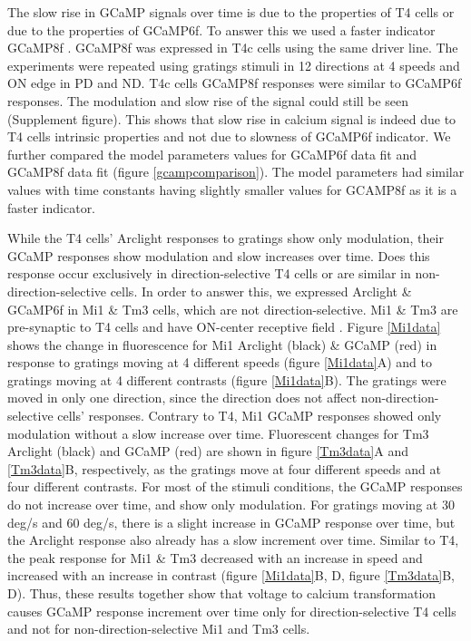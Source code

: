 \documentclass[9pt,lineno]{elife}
\begin{document}
The slow rise in GCaMP signals over time is due to the properties of T4 cells or due to the properties of GCaMP6f. To answer this we used a faster indicator GCaMP8f \parencite{Zhang2020}. GCaMP8f was expressed in T4c cells using the same driver line. The experiments were repeated using gratings stimuli in 12 directions at 4 speeds and ON edge in PD and ND. T4c cells GCaMP8f responses were similar to GCaMP6f responses. The modulation and slow rise of the signal could still be seen (Supplement figure). This shows that slow rise in calcium signal is indeed due to T4 cells intrinsic properties and not due to slowness of GCaMP6f indicator. We further compared the model parameters values for GCaMP6f data fit and GCaMP8f data fit (figure \ref{gcampcomparison}). The model parameters had similar values with time constants having slightly smaller values for GCAMP8f as it is a faster indicator.

While the T4 cells' Arclight responses to gratings show only modulation, their GCaMP responses show modulation and slow increases over time. Does this response occur exclusively in direction-selective T4 cells or are similar in non-direction-selective cells. In order to answer this, we expressed Arclight \& GCaMP6f in Mi1 \& Tm3 cells, which are not direction-selective. Mi1 \& Tm3 are pre-synaptic to T4 cells and have ON-center receptive field \parencite{Takemura2017, Arenz2017}. Figure \ref{Mi1data} shows the change in fluorescence for Mi1 Arclight (black) \& GCaMP (red) in response to gratings moving at 4 different speeds (figure \ref{Mi1data}A) and to gratings moving at 4 different contrasts (figure \ref{Mi1data}B). The gratings were moved in only one direction, since the direction does not affect non-direction-selective cells' responses. Contrary to T4, Mi1 GCaMP responses showed only modulation without a slow increase over time. Fluorescent changes for Tm3 Arclight (black) and GCaMP (red) are shown in figure \ref{Tm3data}A and \ref{Tm3data}B, respectively, as the gratings move at four different speeds and at four different contrasts. For most of the stimuli conditions, the GCaMP responses do not increase over time, and show only modulation. For gratings moving at 30 deg/s and 60 deg/s, there is a slight increase in GCaMP response over time, but the Arclight response also already has a slow increment over time. Similar to T4, the peak response for Mi1 \& Tm3 decreased with an increase in speed and increased with an increase in contrast (figure \ref{Mi1data}B, D, figure \ref{Tm3data}B, D). Thus, these results together show that voltage to calcium transformation causes GCaMP response increment over time only for direction-selective T4 cells and not for non-direction-selective Mi1 and Tm3 cells.
\end{document}
